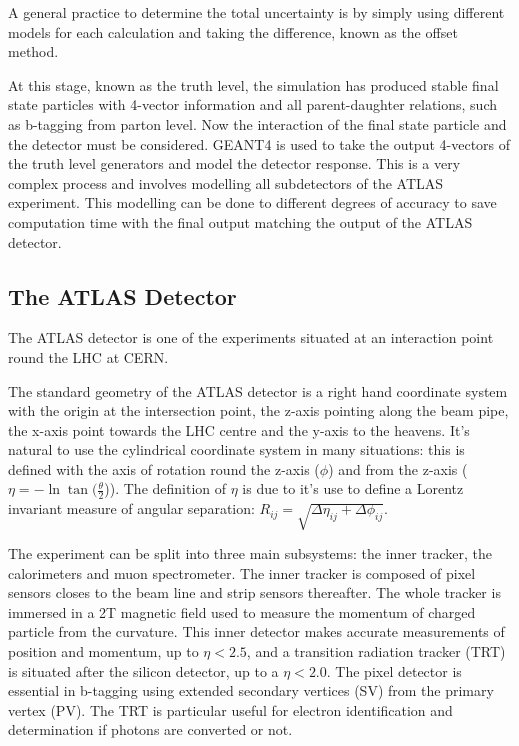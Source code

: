 A general practice to determine the total uncertainty is by simply using different models for each calculation and taking the difference, known as the offset method. 

At this stage, known as the truth level, the simulation has produced stable final state particles with 4-vector information and all parent-daughter relations, such as b-tagging from parton level. Now the interaction of the final state particle and the detector must be considered.       
GEANT4 is used to take the output 4-vectors of the truth level generators and model the detector response. This is a very complex process and involves modelling all subdetectors of the ATLAS experiment. This modelling can be done to different degrees of accuracy to save computation time with the final output matching the output of the ATLAS detector. 
 
\subsection{The ATLAS Detector}
\label{atlasdetector}
The ATLAS detector is one of the experiments situated at an interaction point round the LHC at CERN.


The standard geometry of the ATLAS detector is a right hand coordinate system with the origin at the intersection point, the z-axis pointing along the beam pipe, the x-axis point towards the LHC centre and the y-axis to the heavens. It's natural to use the cylindrical coordinate system in many situations: this is defined with the axis of rotation round the z-axis ($\phi$) and from the z-axis ($\eta=-\ln\tan (\frac{\theta}{2}$)). The definition of $\eta$ is due to it's use to define a Lorentz invariant measure of angular separation: $R_{ij}=\sqrt{\Delta\eta_{ij} + \Delta\phi_{ij}}$.

    
The experiment can be split into three main subsystems: the inner tracker, the calorimeters and muon spectrometer\cite{atlas}. The inner tracker is composed of pixel sensors closes to the beam line and strip sensors thereafter. The whole tracker is immersed in a 2T magnetic field used to measure the momentum of charged particle from the curvature. This inner detector makes accurate measurements of position and momentum, up to $\eta < 2.5 $, and a transition radiation tracker (TRT) is situated after the silicon detector, up to a  $\eta < 2.0$. The pixel detector is essential in b-tagging using extended secondary vertices (SV) from the primary vertex (PV). The TRT is particular useful for electron identification and determination if photons are converted or not.      

